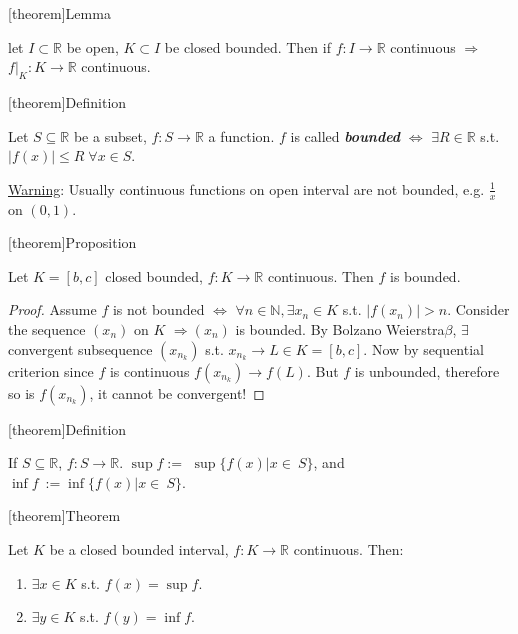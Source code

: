 \documentclass[12pt]{report}
\theoremstyle{definition}
\begin{document}
[theorem]{Lemma}
\begin{closed bound in open interval is continuous}
    let $I \subset \mathbb{R}$ be open, $K \subset I$ be closed bounded.
    Then if $f:I\rightarrow{}\mathbb{R}$ continuous $\Rightarrow{}$
    $f|_K:K\rightarrow{}\mathbb{R}$ continuous.
\end{closed bound in open interval is continuous}

[theorem]{Definition}
\begin{bounded function}
    Let $S \subseteq \mathbb{R}$ be a subset, $f:S\rightarrow{}\mathbb{R}$ a function.
    $f$ is called \textbf{\emph{bounded}} $\iff$
    $\exists R\in\mathbb{R}$ s.t. $|f(x)|\le R \;\forall x \in S$.
\end{bounded function}

\underline{Warning}: Usually continuous functions on open interval are not bounded,
e.g. $\frac{1}{x}$ on $(0,1)$.

[theorem]{Proposition}
\begin{sequence is bounded in closed bounded continuous func}
    Let $K = [b,c]$ closed bounded, $f:K\rightarrow{}\mathbb{R}$ continuous.
    Then $f$ is bounded.
\end{sequence is bounded in closed bounded continuous func}

\begin{proof}
    Assume $f$ is not bounded $\iff$
    $\forall n \in \mathbb{N}, \exists x_n \in K$ s.t. $|f(x_n)|>n$.
    Consider the sequence $(x_n)$ on $K$ $\Rightarrow{}(x_n)$ is bounded.
    By Bolzano Weierstra$\beta$, $\exists$ convergent subsequence $(x_{n_k})$
    s.t. $x_{n_k} \rightarrow{} L \in K = [b,c]$.
    Now by sequential criterion since $f$ is continuous $f(x_{n_k}) \rightarrow{}f(L)$.
    But $f$ is unbounded, therefore so is $f(x_{n_k})$, it cannot be convergent!
\end{proof}

[theorem]{Definition}
\begin{supremum of function}
    If $S \subseteq \mathbb{R}$, $f:S\rightarrow{}\mathbb{R}$.
    $\sup{f} :=$ $ \sup{\{f(x) | x \in\ S\}}$,
    and $\inf{f}\ := \inf{\{ f(x) | x \in\ S\}}$.
\end{supremum of function}

[theorem]{Theorem}
\begin{closed bounded interval func has sup}
    Let $K$ be a closed bounded interval, $f:K\rightarrow{}\mathbb{R}$ continuous. Then:
    \begin{enumerate}[label = (\arabic*)]
        \item $\exists x \in K$ s.t. $f(x) = \sup{f}$.
        \item $\exists y \in K$ s.t. $f(y) = \inf{f}$.
    \end{enumerate}
    
\end{closed bounded interval func has sup}
\end{document}
